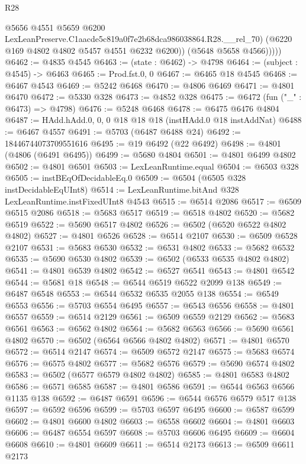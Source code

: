 \begin{lexlean}{R28}
\begin{coremodule}
                @5656
                @4551
                @5659
                @6200
                LexLeanPreserve.C1aacde5c819a0f7e2b68dca986038864.R28.__rel_70)
              (@6220 @169 @4802 @4802 @5457 @4551 @6232 @6200))
            (@5648 @5658 @4566)))))
@6462 := @4835 @4545
@6463 := (state : @6462) -> @4798
@6464 := (subject : @4545) -> @6463
@6465 := Prod.fst.{0, 0}
@6467 := @6465 @18 @4545
@6468 := @6467 @4543
@6469 := @5242 @6468
@6470 := @4806 @6469
@6471 := @4801 @6470
@6472 := @5330 @328
@6473 := @4852 @328
@6475 := @6472 (fun ("_" : @6473) => @4798)
@6476 := @5248 @6468
@6478 := @6475 @6476 @4804
@6487 := HAdd.hAdd.{0, 0, 0} @18 @18 @18 (instHAdd.{0} @18 instAddNat)
@6488 := @6467 @4557
@6491 := @5703 (@6487 @6488 @24)
@6492 := 18446744073709551616
@6495 := @19 @6492 (@22 @6492)
@6498 := @4801 (@4806 (@6491 @6495))
@6499 := @5680 @4804
@6501 := @4801 @6499 @4802
@6502 := @4801 @6501
@6503 := LexLeanRuntime.equal
@6504 := @6503 @328
@6505 := instBEqOfDecidableEq.{0}
@6509 := @6504 (@6505 @328 instDecidableEqUInt8)
@6514 := LexLeanRuntime.bitAnd @328 LexLeanRuntime.instFixedUInt8 @4543
@6515 := @6514 @2086
@6517 := @6509 @6515 @2086
@6518 := @5683 @6517
@6519 := @6518 @4802
@6520 := @5682 @6519
@6522 := @5690 @6517 @4802
@6526 := @6502 (@6520 @6522 @4802 @4802)
@6527 := @4801 @6526
@6528 := @6514 @2107
@6530 := @6509 @6528 @2107
@6531 := @5683 @6530
@6532 := @6531 @4802
@6533 := @5682 @6532
@6535 := @5690 @6530 @4802
@6539 := @6502 (@6533 @6535 @4802 @4802)
@6541 := @4801 @6539 @4802
@6542 := @6527 @6541
@6543 := @4801 @6542
@6544 := @5681 @18
@6548 := @6544 @6519 @6522 @2099 @138
@6549 := @6487 @6548
@6553 := @6544 @6532 @6535 @2055 @138
@6554 := @6549 @6553
@6556 := @5703 @6554 @6495
@6557 := @6543 @6556
@6558 := @4801 @6557
@6559 := @6514 @2129
@6561 := @6509 @6559 @2129
@6562 := @5683 @6561
@6563 := @6562 @4802
@6564 := @5682 @6563
@6566 := @5690 @6561 @4802
@6570 := @6502 (@6564 @6566 @4802 @4802)
@6571 := @4801 @6570
@6572 := @6514 @2147
@6574 := @6509 @6572 @2147
@6575 := @5683 @6574
@6576 := @6575 @4802
@6577 := @5682 @6576
@6579 := @5690 @6574 @4802
@6583 := @6502 (@6577 @6579 @4802 @4802)
@6585 := @4801 @6583 @4802
@6586 := @6571 @6585
@6587 := @4801 @6586
@6591 := @6544 @6563 @6566 @1135 @138
@6592 := @6487 @6591
@6596 := @6544 @6576 @6579 @517 @138
@6597 := @6592 @6596
@6599 := @5703 @6597 @6495
@6600 := @6587 @6599
@6602 := @4801 @6600 @4802
@6603 := @6558 @6602
@6604 := @4801 @6603
@6606 := @6487 @6554 @6597
@6608 := @5703 @6606 @6495
@6609 := @6604 @6608
@6610 := @4801 @6609
@6611 := @6514 @2173
@6613 := @6509 @6611 @2173

\end{coremodule}
\end{lexlean}
